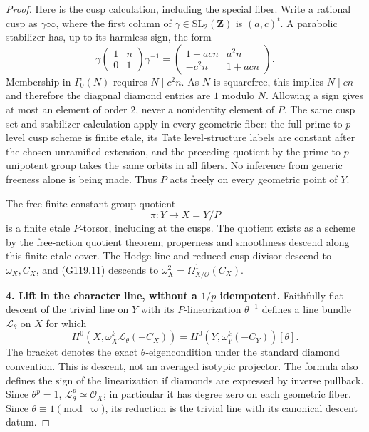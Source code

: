 \begin{proof}
Here is the cusp calculation, including the special fiber.
Write a rational cusp as $\gamma\infty$, where the first column
of $\gamma\in\mathrm{SL}_2(\mathbf Z)$ is $(a,c)^t$.
A parabolic stabilizer has, up to its harmless sign, the form
\[
 \gamma\begin{pmatrix}1&n\\0&1\end{pmatrix}\gamma^{-1}
 =\begin{pmatrix}1-acn&a^2n\\-c^2n&1+acn\end{pmatrix}.
 \tag{G119.12}
\]
Membership in $\Gamma_0(N)$ requires $N\mid c^2n$.
As $N$ is squarefree, this implies $N\mid cn$ and therefore the
diagonal diamond entries are $1$ modulo $N$.
Allowing a sign gives at most an element of order $2$, never a
nonidentity element of $P$.
The same cusp set and stabilizer calculation apply in every
geometric fiber: the full prime-to-$p$ level cusp scheme is finite
etale, its Tate level-structure labels are constant after the chosen
unramified extension, and the preceding quotient by the
prime-to-$p$ unipotent group takes the same orbits in all fibers.
No inference from generic freeness alone is being made.
Thus $P$ acts freely on every geometric point of $Y$.

The free finite constant-group quotient
\[
 \pi:Y\longrightarrow X=Y/P
 \tag{G119.13}
\]
is a finite etale $P$-torsor, including at the cusps.
The quotient exists as a scheme by the free-action
quotient theorem; properness and smoothness descend along this
finite etale cover.
The Hodge line and reduced cusp divisor descend to $\omega_X,C_X$,
and (G119.11) descends to
$\omega_X^2=\Omega^1_{X/\mathcal O}(C_X)$.

\textbf{4. Lift in the character line, without a $1/p$ idempotent.}
Faithfully flat descent of the trivial line on $Y$ with its
$P$-linearization $\theta^{-1}$ defines a line bundle
$\mathcal L_\theta$ on $X$ for which
\[
 H^0(X,\omega_X^k\mathcal L_\theta(-C_X))
  =H^0(Y,\omega_Y^k(-C_Y))[\theta].
 \tag{G119.14}
\]
The bracket denotes the exact $\theta$-eigencondition under the
standard diamond convention.  This is descent, not an averaged
isotypic projector.  The formula also defines the sign of the
linearization if diamonds are expressed by inverse pullback.
Since $\theta^p=1$, $\mathcal L_\theta^p\simeq\mathcal O_X$;
in particular it has degree zero on each geometric fiber.
Since $\theta\equiv1\pmod\varpi$, its reduction is the trivial
line with its canonical descent datum.


\end{proof}
